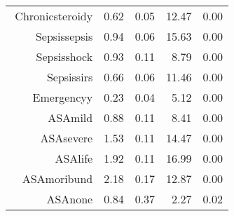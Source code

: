 \begin{tabular}{rrrrr}
$$  Chronic\-steroid\-y & 0.62 & 0.05 & 12.47 & 0.00 \\ 
  Sepsis\-sepsis & 0.94 & 0.06 & 15.63 & 0.00 \\ 
  Sepsis\-shock & 0.93 & 0.11 & 8.79 & 0.00 \\ 
  Sepsis\-sirs & 0.66 & 0.06 & 11.46 & 0.00 \\ 
  Emergency\-y & 0.23 & 0.04 & 5.12 & 0.00 \\ 
  ASA\-mild & 0.88 & 0.11 & 8.41 & 0.00 \\ 
  ASA\-severe & 1.53 & 0.11 & 14.47 & 0.00 \\ 
  ASA\-life & 1.92 & 0.11 & 16.99 & 0.00 \\ 
  ASA\-moribund & 2.18 & 0.17 & 12.87 & 0.00 \\ 
  ASA\-none & 0.84 & 0.37 & 2.27 & 0.02 \\ 
   \hline
\end{tabular}

